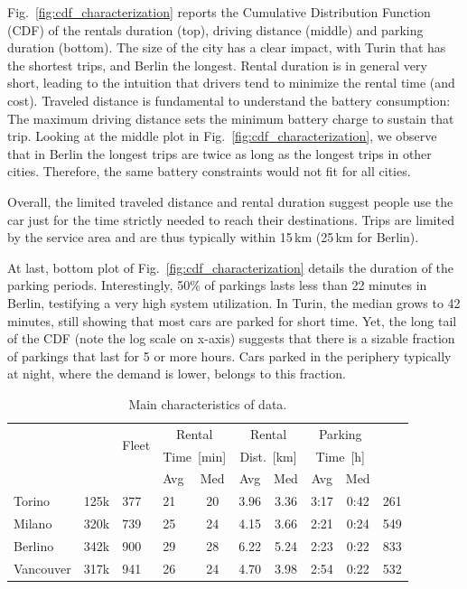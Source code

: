 Fig.~\ref{fig:cdf_characterization} reports the Cumulative Distribution Function (CDF) of the rentals duration (top), driving distance (middle) and parking duration (bottom).
The size of the city has a clear impact, with Turin that has the shortest trips, and Berlin the longest. 
Rental duration is in general very short, leading to the intuition that drivers tend to minimize the rental time (and cost). Traveled distance is fundamental to understand the battery consumption: The maximum driving distance sets the minimum battery charge to sustain that trip. Looking at the middle plot in Fig.~\ref{fig:cdf_characterization}, we observe that in Berlin the longest trips are twice as long as the longest trips in other cities. Therefore, the same battery constraints would not fit for all cities. 

Overall, the limited traveled distance and rental duration suggest people use the car just for the time strictly needed to reach their destinations. Trips are limited by the service area and are thus typically within 15\,km (25\,km for Berlin).

At last, bottom plot of Fig.~\ref{fig:cdf_characterization} details the duration of the parking periods. Interestingly, 50\% of parkings lasts less than 22 minutes in Berlin, testifying a very high system utilization. In Turin, the median grows to 42 minutes, still showing that most cars are parked for short time. Yet, the long tail of the CDF (note the log scale on x-axis) suggests that there is a sizable fraction of parkings that last for 5 or more hours. Cars parked in the periphery typically at night, where the demand is lower, belongs to this fraction.
\begin{table}[h!]
\begin{center}
\scriptsize
\caption{Main characteristics of data.\label{tab:summary}}
\setlength\tabcolsep{5pt} %
\begin{tabular}{|l|l|l|l|c|c|c|c|c|l|}
\hline
\!\multirow{3}{*}{City} &\!\multirow{3}{*}{Rental}\!& \multirow{2}{*}{Fleet} &  \multicolumn{2}{|c|}{Rental}  &  \multicolumn{2}{|c|}{Rental}  &  \multicolumn{2}{|c|}{Parking}  &\!\multirow{3}{*}{Zones}\!\\ 
 &  & \multirow{2}{*}{Size}  & \multicolumn{2}{|c|}{Time~[min]}  & \multicolumn{2}{|c|}{Dist.~[km]} & \multicolumn{2}{|c|}{Time~[h]} &    \\ \cline{4-9} %
 & &  &\!Avg\!&\!Med\!&\!Avg\!&\!Med\!&\!Avg\!&\!Med\!& \\ \hline
\hline
       \!Torino       & 125k & 377 & 21 & 20 & 3.96 & 3.36 & 3:17 & 0:42 & 261 \\ \hline
\!Milano       & 320k & 739 & 25 & 24 & 4.15 & 3.66 & 2:21 & 0:24 & 549 \\ \hline
\!Berlino      & 342k & 900 & 29 & 28 & 6.22 & 5.24 & 2:23 & 0:22 & 833 \\ \hline
\!Vancouver\!  & 317k & 941 & 26 & 24 & 4.70 & 3.98 & 2:54 & 0:22 & 532 \\ \hline

\end{tabular}
\end{center}
\end{table}


